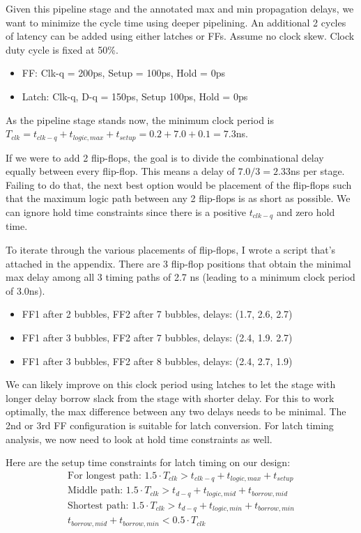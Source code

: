 \documentclass[11pt]{article}
\begin{document}
Given this pipeline stage and the annotated max and min propagation delays, we want to minimize the cycle time using deeper pipelining. An additional 2 cycles of latency can be added using either latches or FFs. Assume no clock skew. Clock duty cycle is fixed at 50\%.

\begin{itemize}
	\item FF: Clk-q = 200ps, Setup = 100ps, Hold = 0ps
	\item Latch: Clk-q, D-q = 150ps, Setup 100ps, Hold = 0ps
\end{itemize}

As the pipeline stage stands now, the minimum clock period is $T_{clk} = t_{clk-q} + t_{logic,max} + t_{setup} = 0.2 + 7.0 + 0.1 = 7.3$ns.

If we were to add 2 flip-flops, the goal is to divide the combinational delay equally between every flip-flop. This means a delay of $7.0/3 = 2.33$ns per stage. Failing to do that, the next best option would be placement of the flip-flops such that the maximum logic path between any 2 flip-flops is as short as possible. We can ignore hold time constraints since there is a positive $t_{clk-q}$ and zero hold time.

To iterate through the various placements of flip-flops, I wrote a script that's attached in the appendix. There are 3 flip-flop positions that obtain the minimal max delay among all 3 timing paths of 2.7 ns (leading to a minimum clock period of 3.0ns).

\begin{itemize}
	\item FF1 after 2 bubbles, FF2 after 7 bubbles, delays: (1.7, 2.6, 2.7)
	\item FF1 after 3 bubbles, FF2 after 7 bubbles, delays: (2.4, 1.9. 2.7)
	\item FF1 after 3 bubbles, FF2 after 8 bubbles, delays: (2.4, 2.7, 1.9)
\end{itemize}

We can likely improve on this clock period using latches to let the stage with longer delay borrow slack from the stage with shorter delay. For this to work optimally, the max difference between any two delays needs to be minimal. The 2nd or 3rd FF configuration is suitable for latch conversion. For latch timing analysis, we now need to look at hold time constraints as well.

Here are the setup time constraints for latch timing on our design:
\begin{eqnarray}
	\text{For longest path: } 1.5 \cdot T_{clk} > t_{clk-q} + t_{logic,max} + t_{setup} \\
	\text{Middle path: } 1.5 \cdot T_{clk} > t_{d-q} + t_{logic,mid} + t_{borrow,mid} \\
	\text{Shortest path: } 1.5 \cdot T_{clk} > t_{d-q} + t_{logic,min} + t_{borrow,min} \\
	t_{borrow,mid} + t_{borrow,min} < 0.5 \cdot T_{clk}
\end{eqnarray}
\end{document}
